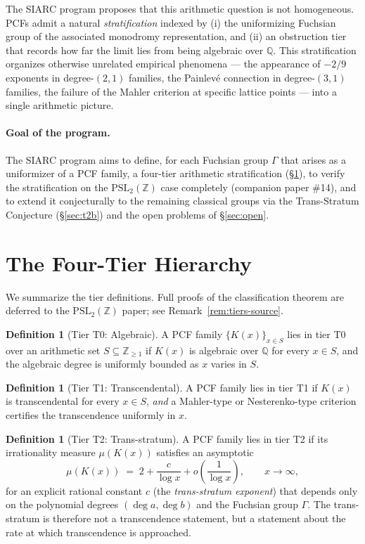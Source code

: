 \documentclass[11pt,a4paper]{article}
\theoremstyle{definition}
\newtheorem{definition}[conjecture]{Definition}
\theoremstyle{remark}
\newcommand{\PSLZ}{\mathrm{PSL}_2(\mathbb{Z})}
\newcommand{\Q}{\mathbb{Q}}
\newcommand{\Z}{\mathbb{Z}}
\begin{document}
The SIARC program proposes that this arithmetic question is not
homogeneous. PCFs admit a natural \emph{stratification} indexed by
(i) the uniformizing Fuchsian group of the associated monodromy
representation, and (ii) an obstruction tier that records how far the
limit lies from being algebraic over $\Q$. This stratification organizes
otherwise unrelated empirical phenomena --- the appearance of $-2/9$
exponents in degree-$(2,1)$ families, the Painlevé connection in
degree-$(3,1)$ families, the failure of the Mahler criterion at
specific lattice points --- into a single arithmetic picture.

\paragraph{Goal of the program.}
The SIARC program aims to define, for each Fuchsian group $\Gamma$ that
arises as a uniformizer of a PCF family, a four-tier arithmetic
stratification (\S\ref{sec:tiers}), to verify the stratification on the
$\PSLZ$ case completely (companion paper \#14), and to extend it
conjecturally to the remaining classical groups via the Trans-Stratum
Conjecture (\S\ref{sec:t2b}) and the open problems of \S\ref{sec:open}.

\section{The Four-Tier Hierarchy}
\label{sec:tiers}

We summarize the tier definitions. Full proofs of the classification
theorem are deferred to the $\PSLZ$ paper; see Remark~\ref{rem:tiers-source}.

\begin{definition}[Tier T0: Algebraic]
A PCF family $\{K(x)\}_{x \in S}$ lies in tier T0 over an arithmetic set
$S \subseteq \Z_{\geq 1}$ if $K(x)$ is algebraic over $\Q$ for every
$x \in S$, and the algebraic degree is uniformly bounded as $x$ varies in $S$.
\end{definition}

\begin{definition}[Tier T1: Transcendental]
A PCF family lies in tier T1 if $K(x)$ is transcendental for every $x \in S$,
\emph{and} a Mahler-type or Nesterenko-type criterion certifies the
transcendence uniformly in $x$.
\end{definition}

\begin{definition}[Tier T2: Trans-stratum]
A PCF family lies in tier T2 if its irrationality measure $\mu(K(x))$
satisfies an asymptotic
\[
   \mu(K(x)) \;=\; 2 + \frac{c}{\log x} + o\!\left(\frac{1}{\log x}\right),
   \qquad x \to \infty,
\]
for an explicit rational constant $c$ (the \emph{trans-stratum exponent})
that depends only on the polynomial degrees $(\deg a, \deg b)$ and the
Fuchsian group $\Gamma$. The trans-stratum is therefore not a transcendence
statement, but a statement about the rate at which transcendence is
approached.
\end{definition}
\end{document}
